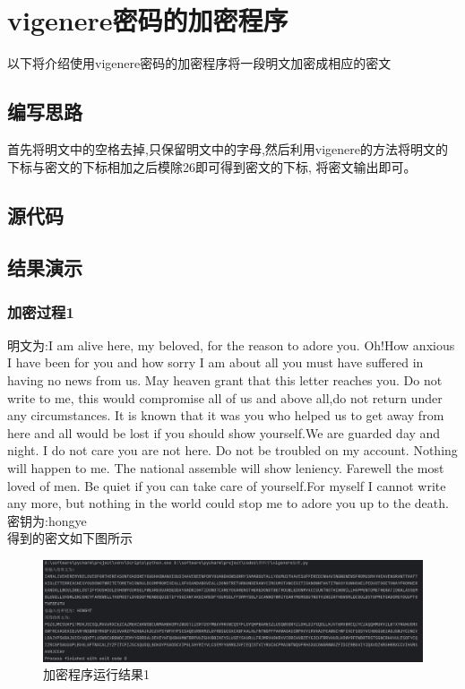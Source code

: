 \section{vigenere密码的加密程序}
以下将介绍使用vigenere密码的加密程序将一段明文加密成相应的密文

\subsection{编写思路}
    首先将明文中的空格去掉,只保留明文中的字母,然后利用vigenere的方法将明文的下标与密文的下标相加之后模除26即可得到密文的下标,
    将密文输出即可。

\subsection{源代码}
    

\newpage
\subsection{结果演示}
    \subsubsection{加密过程1}
        明文为:I am alive here, my beloved, for the reason to adore you. Oh!How anxious I have been 
        for you and how sorry I am about all you must have suffered in having no news from us. May 
        heaven grant that this letter reaches you. Do not write to me, this would compromise all of 
        us and above all,do not return under any circumstances. It is known that it was you who helped 
        us to get away from here and all would be lost if you should show yourself.We are guarded day 
        and night. I do not care you are not here. Do not be troubled on my account. Nothing will happen
        to me. The national assemble will show leniency. Farewell the most loved of men. Be quiet if you
        can take care of yourself.For myself I cannot write any more, but nothing in the world could 
        stop me to adore you up to the death.\\
        密钥为:hongye\\
        得到的密文如下图所示
        \begin{figure}[htbp] %
            \centering    %
            \includegraphics[width=18cm]{images/vigenere_result_1.png}  %
            \caption{加密程序运行结果1}    %
            \label{pic1}        %
        \end{figure}

